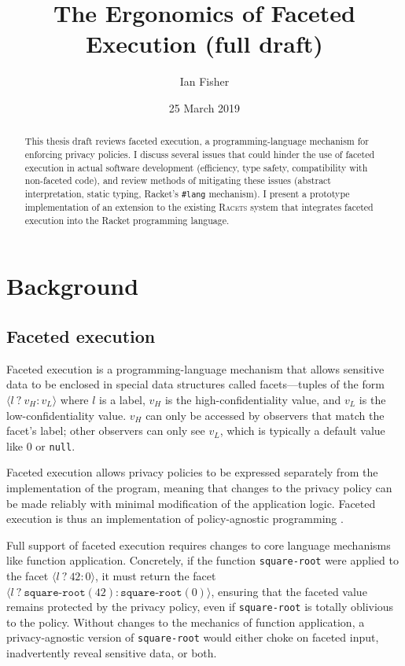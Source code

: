 \documentclass{article}
\title{The Ergonomics of Faceted Execution (full draft)}
\author{Ian Fisher}
\date{25 March 2019}
\begin{document}
\maketitle

\begin{abstract}
	This thesis draft reviews faceted execution, a programming-language mechanism for enforcing privacy policies. I discuss several issues that could hinder the use of faceted execution in actual software development (efficiency, type safety, compatibility with non-faceted code), and review methods of mitigating these issues (abstract interpretation, static typing, Racket's \texttt{\#lang} mechanism). I present a prototype implementation of an extension to the existing \textsc{Racets} system \cite{racets} that integrates faceted execution into the Racket programming language.
\end{abstract}

\tableofcontents



\section{Background}
\subsection{Faceted execution\label{sec:facets}}
Faceted execution is a programming-language mechanism that allows sensitive data to be enclosed in special data structures called facets---tuples of the form $\langle l\ ?\ v_H : v_L \rangle$ where $l$ is a label, $v_H$ is the high-confidentiality value, and $v_L$ is the low-confidentiality value. $v_H$ can only be accessed by observers that match the facet's label; other observers can only see $v_L$, which is typically a default value like $0$ or \texttt{null}.

Faceted execution allows privacy policies to be expressed separately from the implementation of the program, meaning that changes to the privacy policy can be made reliably with minimal modification of the application logic. Faceted execution is thus an implementation of policy-agnostic programming \cite{faceted}.

Full support of faceted execution requires changes to core language mechanisms like function application. Concretely, if the function \texttt{square-root} were applied to the facet $\langle l \ ?\ 42 : 0 \rangle$, it must return the facet $\langle l \ ?\ \texttt{square-root}(42) : \texttt{square-root}(0) \rangle$, ensuring that the faceted value remains protected by the privacy policy, even if \texttt{square-root} is totally oblivious to the policy. Without changes to the mechanics of function application, a privacy-agnostic version of \texttt{square-root} would either choke on faceted input, inadvertently reveal sensitive data, or both.
\end{document}

